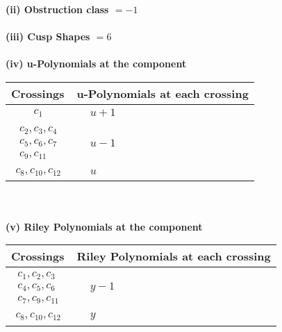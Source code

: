 \documentclass[1p]{elsarticle_modified}
\theoremstyle{definition}
\begin{document}
\flushleft \textbf{(ii) Obstruction class $= -1$}\\~\\
\flushleft \textbf{(iii) Cusp Shapes $= 6$}\\~\\
\newpage\renewcommand{\arraystretch}{1}
\flushleft \textbf{(iv) u-Polynomials at the component}\newline \\
\begin{tabular}{m{50pt}|m{274pt}}
Crossings & \hspace{64pt}u-Polynomials at each crossing \\
\hline $$\begin{aligned}c_{1}\end{aligned}$$&$\begin{aligned}
&u+1
\end{aligned}$\\
\hline $$\begin{aligned}c_{2},c_{3},c_{4}\\c_{5},c_{6},c_{7}\\c_{9},c_{11}\end{aligned}$$&$\begin{aligned}
&u-1
\end{aligned}$\\
\hline $$\begin{aligned}c_{8},c_{10},c_{12}\end{aligned}$$&$\begin{aligned}
&u
\end{aligned}$\\
\hline
\end{tabular}\\~\\
\newpage\renewcommand{\arraystretch}{1}
\flushleft \textbf{(v) Riley Polynomials at the component}\newline \\
\begin{tabular}{m{50pt}|m{274pt}}
Crossings & \hspace{64pt}Riley Polynomials at each crossing \\
\hline $$\begin{aligned}c_{1},c_{2},c_{3}\\c_{4},c_{5},c_{6}\\c_{7},c_{9},c_{11}\end{aligned}$$&$\begin{aligned}
&y-1
\end{aligned}$\\
\hline $$\begin{aligned}c_{8},c_{10},c_{12}\end{aligned}$$&$\begin{aligned}
&y
\end{aligned}$\\
\hline
\end{tabular}\\~\\
\end{document}

